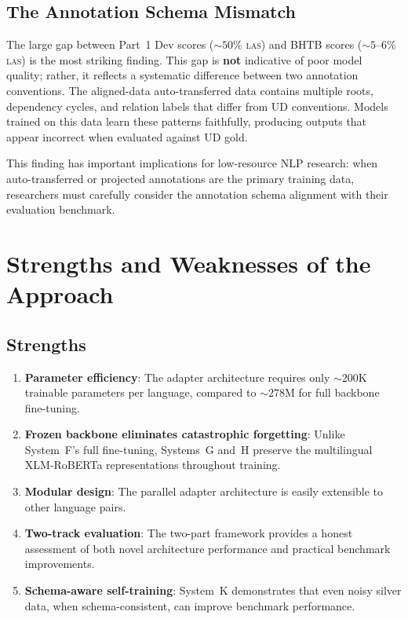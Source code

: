 \documentclass[12pt,a4paper,oneside]{report}
\newcommand{\xlmr}{XLM-RoBERTa}
\newcommand{\las}{\textsc{las}}
\begin{document}
\subsection{The Annotation Schema Mismatch}

The large gap between Part~1 Dev scores (${\sim}50\%$ \las{}) and BHTB scores
(${\sim}5$--6\% \las{}) is the most striking finding. This gap is \textbf{not}
indicative of poor model quality; rather, it reflects a systematic difference between
two annotation conventions. The aligned-data auto-transferred data contains multiple
roots, dependency cycles, and relation labels that differ from UD conventions. Models
trained on this data learn these patterns faithfully, producing outputs that appear
incorrect when evaluated against UD gold.

This finding has important implications for low-resource NLP research: when
auto-transferred or projected annotations are the primary training data, researchers
must carefully consider the annotation schema alignment with their evaluation
benchmark.

\section{Strengths and Weaknesses of the Approach}

\subsection{Strengths}
\begin{enumerate}
  \item \textbf{Parameter efficiency}: The adapter architecture requires only
        ${\sim}200$K trainable parameters per language, compared to ${\sim}278$M for
        full backbone fine-tuning.
  \item \textbf{Frozen backbone eliminates catastrophic forgetting}: Unlike System~F's
        full fine-tuning, Systems~G and~H preserve the multilingual \xlmr{}
        representations throughout training.
  \item \textbf{Modular design}: The parallel adapter architecture is easily
        extensible to other language pairs.
  \item \textbf{Two-track evaluation}: The two-part framework provides a
        honest assessment of both novel architecture performance and practical
        benchmark improvements.
  \item \textbf{Schema-aware self-training}: System~K demonstrates that even noisy
        silver data, when schema-consistent, can improve benchmark performance.
\end{enumerate}
\end{document}

